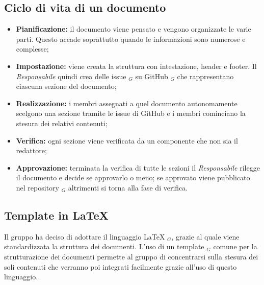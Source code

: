 \subsection{Ciclo di vita di un documento}
\begin{itemize}
    \item \textbf{Pianificazione:} il documento viene pensato e vengono organizzate le varie parti. Questo accade soprattutto quando le informazioni sono numerose e complesse;
    \item \textbf{Impostazione:} viene creata la struttura con intestazione, header e footer. Il \textit{Responsabile} quindi crea delle issue $_G$ su GitHub $_G$ che rappresentano ciascuna sezione del documento;
    \item \textbf{Realizzazione:} i membri assegnati a quel documento autonomamente scelgono una sezione tramite le issue di GitHub e i membri cominciano la stesura dei relativi contenuti;
    \item \textbf{Verifica:} ogni sezione viene verificata da un componente che non sia il redattore;
    \item \textbf{Approvazione:} terminata la verifica di tutte le sezioni il \textit{Responsabile} rilegge il documento e decide se approvarlo o meno; se approvato viene pubblicato nel repository $_G$ altrimenti si torna alla fase di verifica.
\end{itemize}
\subsection{Template in \LaTeX{}}
Il gruppo ha deciso di adottare il linguaggio \LaTeX{} $_G$, grazie al quale viene standardizzata
la struttura dei documenti. L’uso di un template $_G$ comune per la strutturazione dei documenti permette al gruppo di concentrarsi sulla stesura dei soli contenuti che verranno poi integrati facilmente grazie all'uso di questo linguaggio.
